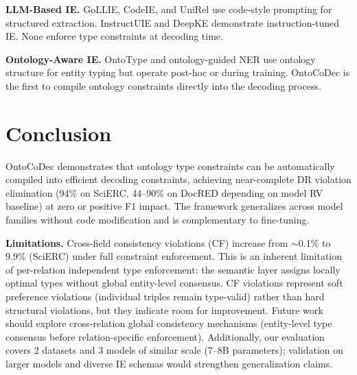 \documentclass[11pt]{article}
\begin{document}
\textbf{LLM-Based IE.} GoLLIE, CodeIE, and UniRel use code-style prompting for structured extraction. InstructUIE and DeepKE demonstrate instruction-tuned IE. None enforce type constraints at decoding time.

\textbf{Ontology-Aware IE.} OntoType and ontology-guided NER use ontology structure for entity typing but operate post-hoc or during training. OntoCoDec is the first to compile ontology constraints directly into the decoding process.

\section{Conclusion}

OntoCoDec demonstrates that ontology type constraints can be automatically compiled into efficient decoding constraints, achieving near-complete DR violation elimination (94\% on SciERC, 44--90\% on DocRED depending on model RV baseline) at zero or positive F1 impact. The framework generalizes across model families without code modification and is complementary to fine-tuning.

\textbf{Limitations.} Cross-field consistency violations (CF) increase from $\sim$0.1\% to 9.9\% (SciERC) under full constraint enforcement. This is an inherent limitation of per-relation independent type enforcement: the semantic layer assigns locally optimal types without global entity-level consensus. CF violations represent soft preference violations (individual triples remain type-valid) rather than hard structural violations, but they indicate room for improvement. Future work should explore cross-relation global consistency mechanisms (entity-level type consensus before relation-specific enforcement). Additionally, our evaluation covers 2 datasets and 3 models of similar scale (7--8B parameters); validation on larger models and diverse IE schemas would strengthen generalization claims.
\end{document}
